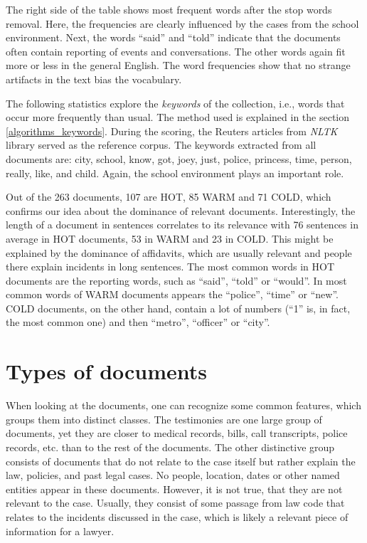 \documentclass[
  digital, %
  notable,   %
  nolof,     %
  nolot,     %
]{fithesis3}
\begin{document}
The right side of the table shows most frequent words after the stop words removal.
Here, the frequencies are clearly influenced by the cases from the school environment.
Next, the words ``said'' and ``told'' indicate that the documents often contain reporting of events and conversations.
The other words again fit more or less in the general English.
The word frequencies show that no strange artifacts in the text bias the vocabulary.

The following statistics explore the \textit{keywords} of the collection, i.e., words that occur more frequently than usual.
The method used is explained in the section \ref{algorithms_keywords}.
During the scoring, the Reuters articles from \textit{NLTK} library served as the reference corpus.
The keywords extracted from all documents are: city, school, know, got, joey, just, police, princess, time, person, really, like, and child.
Again, the school environment plays an important role.

Out of the 263 documents, 107 are HOT, 85 WARM and 71 COLD, which confirms our idea about the dominance of relevant documents.
Interestingly, the length of a document in sentences correlates to its relevance with 76 sentences in average in HOT documents, 53 in WARM and 23 in COLD.
This might be explained by the dominance of affidavits, which are usually relevant and people there explain incidents in long sentences.
The most common words in HOT documents are the reporting words, such as ``said'', ``told'' or ``would''. 
In most common words of WARM documents appears the ``police'', ``time'' or ``new''.
COLD documents, on the other hand, contain a lot of numbers (``1'' is, in fact, the most common one) and then ``metro'', ``officer'' or ``city''.

\section{Types of documents}
When looking at the documents, one can recognize some common features, which groups them into distinct classes.
The testimonies are one large group of documents, yet they are closer to medical records, bills, call transcripts, police records, etc. than to the rest of the documents.
The other distinctive group consists of documents that do not relate to the case itself but rather explain the law, policies, and past legal cases.
No people, location, dates or other named entities appear in these documents.
However, it is not true, that they are not relevant to the case.
Usually, they consist of some passage from law code that relates to the incidents discussed in the case, which is likely a relevant piece of information for a lawyer.
\end{document}
